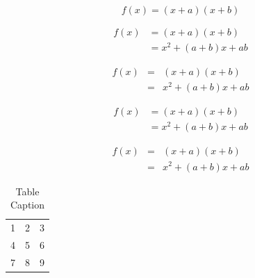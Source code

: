 \documentclass[authoryear,preprint,review,12pt]{elsarticle}
\begin{document}
\begin{equation*}
f(x) = (x+a)(x+b)
\end{equation*}

\begin{align}
 f(x) &= (x+a)(x+b) \\
      &= x^2 + (a+b)x + ab
\end{align}

\begin{eqnarray}
 f(x) &=& (x+a)(x+b) \nonumber\\ %
      &=& x^2 + (a+b)x + ab
\end{eqnarray}

\begin{align*}
 f(x) &= (x+a)(x+b) \\
      &= x^2 + (a+b)x + ab
\end{align*}

\begin{eqnarray*}
 f(x)&=& (x+a)(x+b) \\
     &=& x^2 + (a+b)x + ab
\end{eqnarray*}


\begin{table}[t]%
\centering%
\begin{tabular}{l c r}%
  1 & 2 & 3 \\ %
  4 & 5 & 6 \\
  7 & 8 & 9 \\
\end{tabular}
\caption{Table Caption}\label{fig1}
\end{table}
\end{document}
